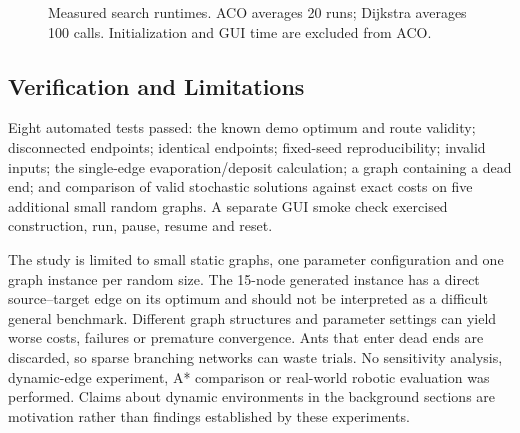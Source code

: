 \documentclass[conference]{IEEEtran}
\begin{document}
\begin{figure}[tb]\centering{}\caption{Measured search runtimes. ACO averages 20 runs; Dijkstra averages 100 calls. Initialization and GUI time are excluded from ACO.}\label{fig:runtime}\end{figure}

\subsection{Verification and Limitations}
Eight automated tests passed: the known demo optimum and route validity; disconnected endpoints; identical endpoints; fixed-seed reproducibility; invalid inputs; the single-edge evaporation/deposit calculation; a graph containing a dead end; and comparison of valid stochastic solutions against exact costs on five additional small random graphs. A separate GUI smoke check exercised construction, run, pause, resume and reset.

The study is limited to small static graphs, one parameter configuration and one graph instance per random size. The 15-node generated instance has a direct source--target edge on its optimum and should not be interpreted as a difficult general benchmark. Different graph structures and parameter settings can yield worse costs, failures or premature convergence. Ants that enter dead ends are discarded, so sparse branching networks can waste trials. No sensitivity analysis, dynamic-edge experiment, A* comparison or real-world robotic evaluation was performed. Claims about dynamic environments in the background sections are motivation rather than findings established by these experiments.
\end{document}
